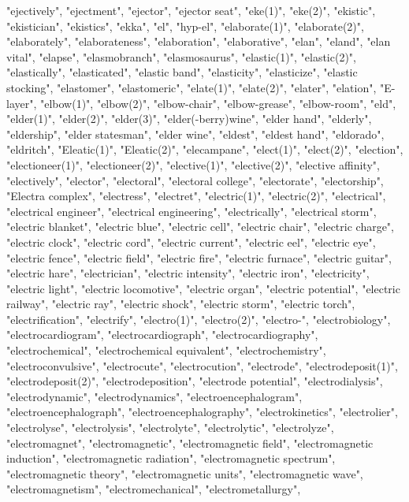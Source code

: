 "ejectively",
"ejectment",
"ejector",
"ejector seat",
"eke(1)",
"eke(2)",
"ekistic",
"ekistician",
"ekistics",
"ekka",
"el",
"hyp-el",
"elaborate(1)",
"elaborate(2)",
"elaborately",
"elaborateness",
"elaboration",
"elaborative",
"elan",
"eland",
"elan vital",
"elapse",
"elasmobranch",
"elasmosaurus",
"elastic(1)",
"elastic(2)",
"elastically",
"elasticated",
"elastic band",
"elasticity",
"elasticize",
"elastic stocking",
"elastomer",
"elastomeric",
"elate(1)",
"elate(2)",
"elater",
"elation",
"E-layer",
"elbow(1)",
"elbow(2)",
"elbow-chair",
"elbow-grease",
"elbow-room",
"eld",
"elder(1)",
"elder(2)",
"elder(3)",
"elder(-berry)wine",
"elder hand",
"elderly",
"eldership",
"elder statesman",
"elder wine",
"eldest",
"eldest hand",
"eldorado",
"eldritch",
"Eleatic(1)",
"Eleatic(2)",
"elecampane",
"elect(1)",
"elect(2)",
"election",
"electioneer(1)",
"electioneer(2)",
"elective(1)",
"elective(2)",
"elective affinity",
"electively",
"elector",
"electoral",
"electoral college",
"electorate",
"electorship",
"Electra complex",
"electress",
"electret",
"electric(1)",
"electric(2)",
"electrical",
"electrical engineer",
"electrical engineering",
"electrically",
"electrical storm",
"electric blanket",
"electric blue",
"electric cell",
"electric chair",
"electric charge",
"electric clock",
"electric cord",
"electric current",
"electric eel",
"electric eye",
"electric fence",
"electric field",
"electric fire",
"electric furnace",
"electric guitar",
"electric hare",
"electrician",
"electric intensity",
"electric iron",
"electricity",
"electric light",
"electric locomotive",
"electric organ",
"electric potential",
"electric railway",
"electric ray",
"electric shock",
"electric storm",
"electric torch",
"electrification",
"electrify",
"electro(1)",
"electro(2)",
"electro-",
"electrobiology",
"electrocardiogram",
"electrocardiograph",
"electrocardiography",
"electrochemical",
"electrochemical equivalent",
"electrochemistry",
"electroconvulsive",
"electrocute",
"electrocution",
"electrode",
"electrodeposit(1)",
"electrodeposit(2)",
"electrodeposition",
"electrode potential",
"electrodialysis",
"electrodynamic",
"electrodynamics",
"electroencephalogram",
"electroencephalograph",
"electroencephalography",
"electrokinetics",
"electrolier",
"electrolyse",
"electrolysis",
"electrolyte",
"electrolytic",
"electrolyze",
"electromagnet",
"electromagnetic",
"electromagnetic field",
"electromagnetic induction",
"electromagnetic radiation",
"electromagnetic spectrum",
"electromagnetic theory",
"electromagnetic units",
"electromagnetic wave",
"electromagnetism",
"electromechanical",
"electrometallurgy",
